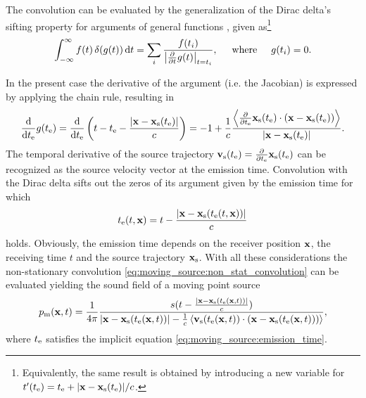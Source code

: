 The convolution can be evaluated by the generalization of the Dirac delta's sifting property for arguments of general functions \cite{Dowling1983, Crighton1992, Jackson1999}, given as\footnote{Equivalently, the same result is obtained by introducing a new variable for $t'(t_{\mathrm{e}}) = t_{\mathrm{e}} + |\mathbf{x}-\mathbf{x}_{\mathrm{s}}(t_{\mathrm{e}})|/c$.}
\begin{equation}
\int_{-\infty}^{\infty} f(t) \, \delta(g(t)) \, \mathrm{d} t = \sum_{i} \frac{f(t_i)}{\left| \frac{\partial}{\partial t} g(t) \right|_{t = t_i}}, \hspace{5mm} \text{where} \hspace{5mm} g(t_i) = 0.
\end{equation}

In the present case the derivative of the argument (i.e. the Jacobian) is expressed by applying the chain rule, resulting in
\begin{equation}
\label{eq:moving_source:jacobian}
\frac{\mathrm{d} }{\mathrm{d} t_{\mathrm{e}}} g(t_{\mathrm{e}}) = 
\frac{\mathrm{d} }{\mathrm{d} t_{\mathrm{e}}} \left( t - t_{\mathrm{e}} - \frac{|\mathbf{x}-\mathbf{x}_{\mathrm{s}}(t_{\mathrm{e}})|}{c}  \right) =
- 1 + \frac{1}{c} \frac{\left< \frac{\partial}{\partial t_{\mathrm{e}}} \mathbf{x}_{\mathrm{s}}(t_{\mathrm{e}}) \cdot (\mathbf{x}-\mathbf{x}_{\mathrm{s}}(t_{\mathrm{e}}))\right> }{|\mathbf{x}-\mathbf{x}_{\mathrm{s}}(t_{\mathrm{e}})|}.
\end{equation}
The temporal derivative of the source trajectory $\mathbf{v}_{\mathrm{s}}(t_{\mathrm{e}}) = \frac{\partial}{\partial t_{\mathrm{e}}}\mathbf{x}_{\mathrm{s}}(t_{\mathrm{e}})$ can be recognized as the source velocity vector at the emission time.
Convolution with the Dirac delta sifts out the zeros of its argument given by the emission time for which
\begin{equation}
\label{eq:moving_source:emission_time}
t_{\mathrm{e}}(t,\mathbf{x}) = t - \frac{|\mathbf{x}-\mathbf{x}_{\mathrm{s}}(t_{\mathrm{e}}(t,\mathbf{x}))|}{c}
\end{equation}
holds.
Obviously, the emission time depends on the receiver position $\mathbf{x}$, the receiving time $t$ and the source trajectory $\mathbf{x}_{\mathrm{s}}$.
With all these considerations the non-stationary convolution \eqref{eq:moving_source:non_stat_convolution} can be evaluated yielding the sound field of a moving point source
\begin{equation}
p_{\mathrm{m}}(\mathbf{x},t) =
\frac{1}{4\pi} \frac{ s(t - \frac{|\mathbf{x}-\mathbf{x}_{\mathrm{s}}(t_{\mathrm{e}}(\mathbf{x},t))|}{c} ) }{|\mathbf{x}-\mathbf{x}_{\mathrm{s}}(t_{\mathrm{e}}(\mathbf{x},t))| - \frac{1}{c}\left< \mathbf{v}_{\mathrm{s}}(t_{\mathrm{e}}(\mathbf{x},t)) \cdot (\mathbf{x}-\mathbf{x}_{\mathrm{s}}(t_{\mathrm{e}}(\mathbf{x},t)))\right> },
\end{equation}
where $t_{\mathrm{e}}$ satisfies the implicit equation \eqref{eq:moving_source:emission_time}.

